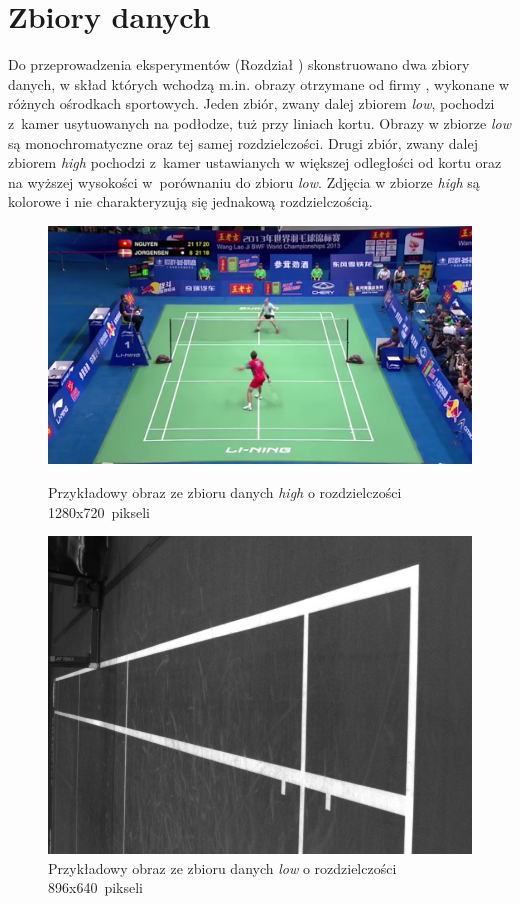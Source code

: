 \section{Zbiory danych}
\label{sec:zbiory}
Do przeprowadzenia eksperymentów (Rozdział ) skonstruowano dwa zbiory danych, w skład których wchodzą m.in. obrazy otrzymane od firmy \blue{}, wykonane w różnych ośrodkach sportowych.
Jeden zbiór, zwany dalej zbiorem \textit{low}, pochodzi z~kamer usytuowanych na podłodze, tuż przy liniach kortu. Obrazy w zbiorze \textit{low} są monochromatyczne oraz tej samej rozdzielczości.
Drugi zbiór, zwany dalej zbiorem \textit{high} pochodzi z~kamer ustawianych w większej odległości od kortu oraz na wyższej wysokości w~porównaniu do zbioru \textit{low}. Zdjęcia w zbiorze \textit{high} są kolorowe i nie charakteryzują się jednakową rozdzielczością.


\begin{figure}[!htb]
    \includegraphics[width=\linewidth]{../../badminton/datasets/high/split/test_court2-00002.png}
    \caption{Przykładowy obraz ze zbioru danych \textit{high} o rozdzielczości 1280x720~pikseli}
  \endminipage\hfill
    \includegraphics[width=\linewidth]{../../badminton/datasets/low/split/1564909032792410075.jpg}
    \caption{Przykładowy obraz ze zbioru danych \textit{low} o rozdzielczości 896x640~pikseli}
  \endminipage\hfill
\end{figure}

